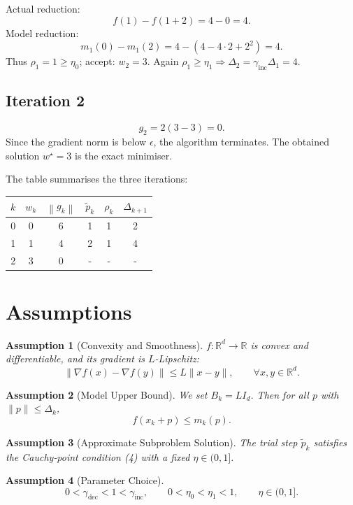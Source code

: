 \documentclass[11pt]{article}
\newtheorem{assumption}{Assumption}
\newcommand{\norm}[1]{\left\lVert #1\right\rVert}
\begin{document}
Actual reduction:
\[
f(1)-f(1+2)=4-0=4.
\]
Model reduction:
\[
m_1(0)-m_1(2)=4-(4-4\cdot2+2^2)=4.
\]
Thus \(\rho_1=1\ge\eta_0\); accept: \(w_2=3\).  
Again \(\rho_1\ge\eta_1\Rightarrow\Delta_2= \gamma_{\mathrm{inc}}\Delta_1=4\).

\subsection*{Iteration 2}
\[
g_2 = 2(3-3)=0.
\]
Since the gradient norm is below \(\epsilon\), the algorithm terminates.  
The obtained solution \(w^{\star}=3\) is the exact minimiser.

The table summarises the three iterations:

\begin{center}
\begin{tabular}{c|c|c|c|c|c}
\(k\) & \(w_k\) & \(\norm{g_k}\) & \(\tilde p_k\) & \(\rho_k\) & \(\Delta_{k+1}\) \\ \hline
0 & 0 & 6 & 1 & 1 & 2\\
1 & 1 & 4 & 2 & 1 & 4\\
2 & 3 & 0 & - & - & -\\
\end{tabular}
\end{center}

\section*{Assumptions}
\begin{assumption}[Convexity and Smoothness]\label{ass:convex}
\(f:\mathbb{R}^{d}\to\mathbb{R}\) is convex and differentiable, and its gradient is \(L\)-Lipschitz:
\[
\|\nabla f(x)-\nabla f(y)\|\le L\|x-y\|,\qquad\forall x,y\in\mathbb{R}^{d}.
\]
\end{assumption}
\begin{assumption}[Model Upper Bound]\label{ass:upper}
We set \(B_k=L I_d\). Then for all \(p\) with \(\|p\|\le\Delta_k\),
\[
f(x_k+p)\le m_k(p).
\]
\end{assumption}
\begin{assumption}[Approximate Subproblem Solution]\label{ass:approx}
The trial step \(\tilde p_k\) satisfies the Cauchy‑point condition (4) with a fixed \(\eta\in(0,1]\).
\end{assumption}
\begin{assumption}[Parameter Choice]\label{ass:param}
\[
0<\gamma_{\mathrm{dec}}<1<\gamma_{\mathrm{inc}},\qquad
0<\eta_0<\eta_1<1,\qquad
\eta\in(0,1].
\]
\end{assumption}
\end{document}

